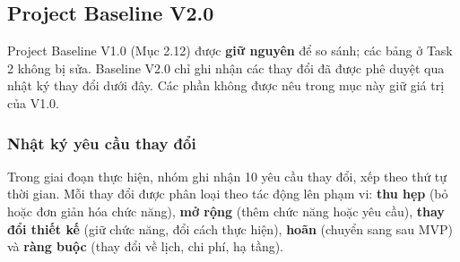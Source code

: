 \subsection{Project Baseline V2.0}
\label{sec:t3-baseline-v2}

Project Baseline V1.0 (Mục 2.12) được \textbf{giữ nguyên} để so sánh; các bảng ở Task 2 không bị sửa. Baseline V2.0 chỉ ghi nhận các thay đổi đã được phê duyệt qua nhật ký thay đổi dưới đây. Các phần không được nêu trong mục này giữ giá trị của V1.0.

\subsubsection{Nhật ký yêu cầu thay đổi}

Trong giai đoạn thực hiện, nhóm ghi nhận 10 yêu cầu thay đổi, xếp theo thứ tự thời gian. Mỗi thay đổi được phân loại theo tác động lên phạm vi: \textbf{thu hẹp} (bỏ hoặc đơn giản hóa chức năng), \textbf{mở rộng} (thêm chức năng hoặc yêu cầu), \textbf{thay đổi thiết kế} (giữ chức năng, đổi cách thực hiện), \textbf{hoãn} (chuyển sang sau MVP) và \textbf{ràng buộc} (thay đổi về lịch, chi phí, hạ tầng).

